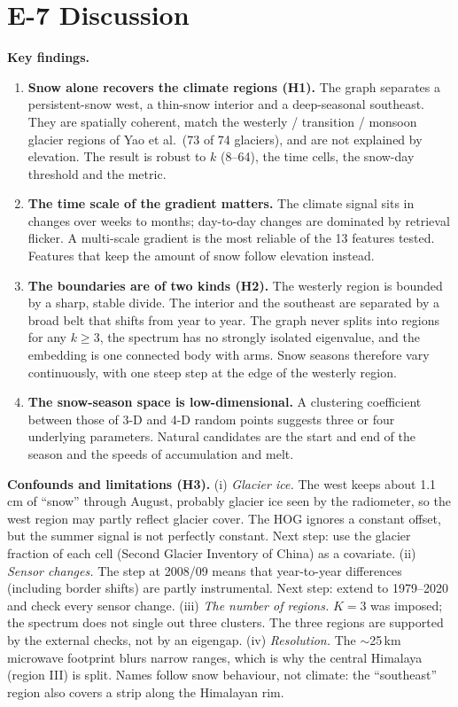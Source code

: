 \documentclass[11pt]{article}
\begin{document}
\clearpage
\section*{E-7 \quad Discussion}

\textbf{Key findings.}
\begin{enumerate}\setlength\itemsep{0.15em}
  \item \textbf{Snow alone recovers the climate regions (H1).} The graph separates a
        persistent-snow west, a thin-snow interior and a deep-seasonal southeast. They are
        spatially coherent, match the westerly / transition / monsoon glacier regions of
        Yao et al.\ (73 of 74 glaciers), and are not explained by elevation. The result
        is robust to $k$ (8--64), the time cells, the snow-day threshold and the metric.
  \item \textbf{The time scale of the gradient matters.} The climate signal sits in
        changes over weeks to months; day-to-day changes are dominated by retrieval
        flicker. A multi-scale gradient is the most reliable of the 13 features tested.
        Features that keep the amount of snow follow elevation instead.
  \item \textbf{The boundaries are of two kinds (H2).} The westerly region is bounded by a
        sharp, stable divide. The interior and the southeast are separated by a broad belt
        that shifts from year to year. The graph never splits into regions for any
        $k \ge 3$, the spectrum has no strongly isolated eigenvalue, and the embedding is
        one connected body with arms. Snow seasons therefore vary continuously, with one
        steep step at the edge of the westerly region.
  \item \textbf{The snow-season space is low-dimensional.} A clustering coefficient between
        those of 3-D and 4-D random points suggests three or four underlying parameters.
        Natural candidates are the start and end of the season and the speeds of
        accumulation and melt.
\end{enumerate}

\textbf{Confounds and limitations (H3).}
(i) \emph{Glacier ice.} The west keeps about 1.1\,cm of ``snow'' through August, probably
glacier ice seen by the radiometer, so the west region may partly reflect glacier cover.
The HOG ignores a constant offset, but the summer signal is not perfectly constant. Next
step: use the glacier fraction of each cell (Second Glacier Inventory of China) as a
covariate.
(ii) \emph{Sensor changes.} The step at 2008/09 means that year-to-year differences
(including border shifts) are partly instrumental. Next step: extend to 1979--2020 and
check every sensor change.
(iii) \emph{The number of regions.} $K = 3$ was imposed; the spectrum does not single out
three clusters. The three regions are supported by the external checks, not by an
eigengap.
(iv) \emph{Resolution.} The $\sim$25\,km microwave footprint blurs narrow ranges, which is
why the central Himalaya (region III) is split. Names follow snow behaviour, not
climate: the ``southeast'' region also covers a strip along the Himalayan rim.
\end{document}
